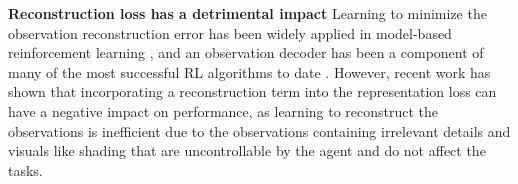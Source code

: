 \documentclass{article}
\theoremstyle{plain}
\theoremstyle{definition}
\theoremstyle{remark}
\newcommand{\our}{\textsc{iQRL}\xspace}
\begin{document}






\textbf{Reconstruction loss has a detrimental impact}
Learning to minimize the observation reconstruction error has been widely applied in model-based reinforcement learning \cite{sutton2018reinforcement, haRecurrentWorldModels2018, hafnerLearning2019}, and an observation decoder has been a component of many of the most successful RL algorithms to date \cite{hafner2023mastering}. However, recent work \citep{zhaoSimplifiedTemporalConsistency2023,hansenTemporalDifferenceLearning2022}
has shown that incorporating a reconstruction term into the representation loss can have a negative impact on performance, as learning to reconstruct the observations is inefficient due to the observations containing irrelevant details and visuals like shading that are uncontrollable by the agent and do not affect the tasks.
\end{document}
